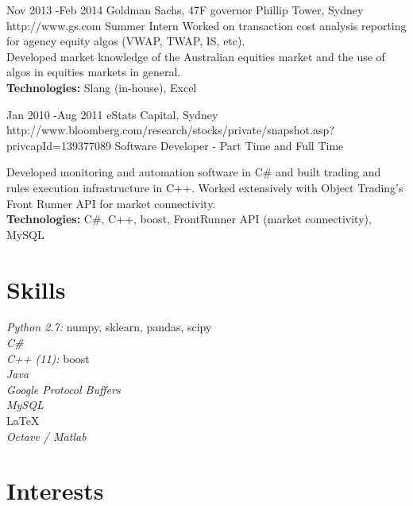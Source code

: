\documentclass[10pt,hidelinks]{article} %
\begin{document}
\job
{Nov 2013 -}{Feb 2014}
{Goldman Sachs, 47F governor Phillip Tower, Sydney}
{http://www.gs.com}
{Summer Intern}
{
Worked on transaction cost analysis reporting for agency equity algos (VWAP, TWAP, IS, etc).\\
Developed market knowledge of the Australian equities market and the use of algos in equities markets in general. \\

\textbf{Technologies:} Slang (in-house), Excel
}



\job
{Jan 2010 -}{Aug 2011}
{eStats Capital, Sydney}
{http://www.bloomberg.com/research/stocks/private/snapshot.asp?privcapId=139377089}
{Software Developer - Part Time and Full Time}
{

Developed monitoring and automation software in C\# and built trading and rules execution
infrastructure in C++. Worked extensively with Object Trading's Front Runner API for market connectivity.\\
\textbf{Technologies:} C\#, C++, boost, FrontRunner API (market connectivity), MySQL

}



\section{Skills}

{
\textit{Python 2.7:} numpy, sklearn, pandas, scipy\\
\textit{C\#}\\
\textit{C++ (11):} boost\\
\textit{Java} \\
\textit{Google Protocol Buffers}\\
\textit{MySQL}\\
\LaTeX \\
\textit{Octave / Matlab}

}


\section{Interests}
\end{document}
